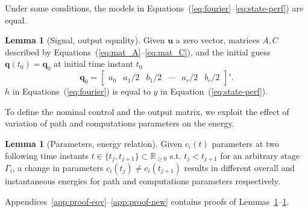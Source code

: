 \documentclass[letterpaper,10pt,journal,twoside]{IEEEtran}
\theoremstyle{definition}
\newtheorem{lem}[thm]{Lemma}
\begin{document}

Under some conditions, the models in Equations~(\ref{eq:fourier}--\ref{eq:state-perf}) are equal.

\begin{lem}[Signal, output equality]\label{lem:eqv}Given $\mathbf{u}$ a zero vector, matrices $A,C$ described by Equations~(\ref{eq:mat_A}--\ref{eq:mat_C}), and the initial guess $\mathbf{q}(t_0)=\mathbf{q}_0$ at initial time instant $t_0$
  \begin{equation*}
  \mathbf{q}_0=\begin{bmatrix}a_0 & a_1/2 & b_1/2 & \cdots & a_r/2 & b_r/2\end{bmatrix}'.
  \end{equation*} 
  $h$ in Equations~(\ref{eq:fourier}) is equal to $y$ in Equation~(\ref{eq:state-perf}).
\end{lem}

To define the nominal control and the output matrix, we exploit the effect of variation of path and computations parameters on the energy. 

\begin{lem}[Parameters, energy relation]\label{lem:new}
  Given $c_i(t)$ parameters at two following time instants $t\in\{t_j,t_{j+1}\}\subset\mathbb{R}_{\geq 0}$ s.t. $t_j<t_{j+1}$ for an arbitrary stage $\Gamma_i$, a change in parameters $c_i(t_j)\neq c_i(t_{j+1})$ results in different overall and instantaneous energies for path and computations parameters respectively.
\end{lem}

Appendices~\ref{app:proof-eqv}--\ref{app:proof-new} contains proofs of Lemmas~\ref{lem:eqv}--\ref{lem:new}.
\end{document}
